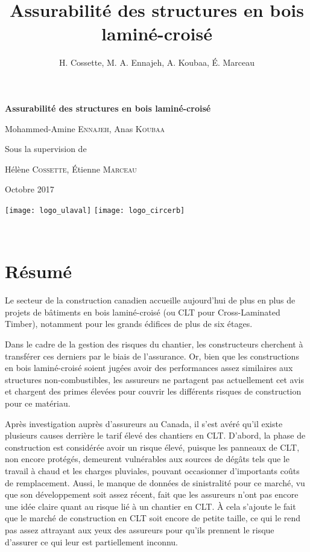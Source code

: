 \documentclass[11pt]{article}
\title{Assurabilité des structures en bois laminé-croisé}
\author{H. Cossette, M. A. Ennajeh, A. Koubaa, É. Marceau}
\date{}
\begin{document}
\sloppy

\begin{titlepage}
\centering
	{\huge\bfseries  Assurabilité des structures en bois laminé-croisé \par}
	
	\vspace{1cm}
	{\Large Mohammed-Amine \textsc{Ennajeh}, Anas \textsc{Koubaa}\par}
	\vspace*{1cm}
	\large Sous la supervision de \par
	\Large Hélène \textsc{Cossette}, Étienne \textsc{Marceau} 
	\vspace*{1cm}
	
	Octobre 2017
	\vfill
	

	
\texttt{[image: logo\_ulaval]}
\hspace{8cm}
\texttt{[image: logo\_circerb]}
\end{titlepage}



\ \newpage
\section*{Résumé}

Le secteur de la construction canadien accueille aujourd'hui de plus en plus de projets de bâtiments en bois laminé-croisé (ou CLT pour Cross-Laminated Timber), notamment pour les grands édifices de plus de six étages. 

Dans le cadre de la gestion des risques du chantier, les constructeurs cherchent à transférer ces derniers par le biais de l'assurance. Or, bien que les constructions en bois laminé-croisé soient jugées avoir des performances assez similaires aux structures non-combustibles, les assureurs ne partagent pas actuellement cet avis et chargent des primes élevées pour couvrir les différents risques de construction pour ce matériau. 

Après investigation auprès d'assureurs au Canada, il s'est avéré qu'il existe plusieurs causes derrière le tarif élevé des chantiers en CLT. D'abord, la phase de construction est considérée avoir un risque élevé, puisque les panneaux de CLT, non encore protégés, demeurent vulnérables aux sources de dégâts tels que le travail à chaud et les charges pluviales, pouvant occasionner d'importants coûts de remplacement. Aussi, le manque de données de sinistralité pour ce marché, vu que son développement soit assez récent, fait que les assureurs n'ont pas encore une idée claire quant au risque lié à un chantier en CLT. À cela s'ajoute le fait que le marché de construction en CLT soit encore de petite taille, ce qui le rend pas assez attrayant aux yeux des assureurs pour qu'ils prennent le risque d'assurer ce qui leur est partiellement inconnu. 
\end{document}
